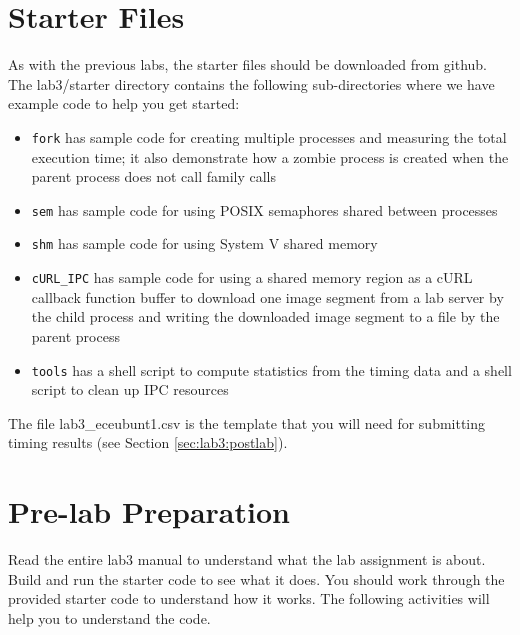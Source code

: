 \section{Starter Files}
As with the previous labs, the starter files should be downloaded from github. The lab3/starter directory contains the following sub-directories where we have example code to help you get started:
\begin{itemize}
\item \verb+fork+ has sample code for creating multiple processes and measuring the total execution time;
  it also demonstrate how a zombie process is created when the parent process does not call  family calls
\item \verb+sem+ has sample code for using POSIX semaphores shared between processes
\item \verb+shm+ has sample code for using System V shared memory
\item \verb+cURL_IPC+ has sample code for using a shared memory region as a cURL callback function buffer to download one image segment from a lab server by the child process and writing the downloaded image segment to a file by the parent process
\item \verb+tools+ has a shell script to compute statistics from the timing data and a shell script to clean up IPC resources
\end{itemize}
The file lab3\_eceubunt1.csv is the template that you will need for submitting timing results (see Section \ref{sec:lab3:postlab}).
\section{Pre-lab Preparation}
Read the entire lab3 manual to understand what the lab assignment is about. Build and run the starter code to see what it does. You should work through the provided starter code to understand how it works. The following activities will help you to understand the code.


